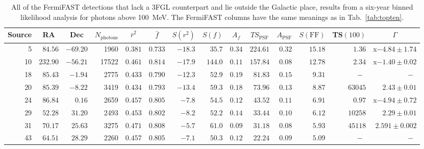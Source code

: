 \documentclass[useAMS,usenatbib]{mn2e}
\begin{document}
\begin{table}
  \caption{ All of the FermiFAST detections that lack a 3FGL
    counterpart and lie outside the Galactic place, results from a
    six-year binned likelihood analysis for photons above 100~MeV.
    The FermiFAST columns have the same meanings as in
    Tab.~\ref{tab:topten}.}
  \label{tab:fermisig100MeV}
\begin{tabular}{rrrrrrrrrrrrrr}
    \hline
    \multicolumn{1}{c}{Source} & \multicolumn{1}{c}{RA} & \multicolumn{1}{c}{Dec}  & \multicolumn{1}{c}{$N_\mathrm{photons}$}  &\multicolumn{1}{c}{$\bar r^2$} & \multicolumn{1}{c}{$\bar f$} & \multicolumn{1}{c}{$S(r^2)$} & \multicolumn{1}{c}{$S(f)$} & \multicolumn{1}{c}{$A_f$} & \multicolumn{1}{c}{$TS_\mathrm{PSF}$} & \multicolumn{1}{c}{$A_\mathrm{PSF}$} & \multicolumn{1}{c}{$S(\mathrm{FF})$} & \multicolumn{1}{c}{TS$(100)$}  & \multicolumn{1}{c}{$\Gamma$} 
 \\
 \hline
 5 & $ 84.56$ & $-69.20$ &   1960 & $0.381$ & $0.733$ & $ -18.3$ & $  35.7$ & $0.34$ & $   224.61$ & $0.32$ & $    15.18$ & $1.36$ & x$-4.84\pm1.74$ \\ 
10 & $232.90$ & $-56.21$ &  17522 & $0.461$ & $0.814$ & $ -17.9$ & $ 144.0$ & $0.11$ & $   157.84$ & $0.08$ & $    12.78$ & $2.34$ & x$-1.40\pm0.02$ \\ 
18 & $ 85.43$ & $ -1.94$ &   2775 & $0.433$ & $0.790$ & $ -12.3$ & $  52.9$ & $0.19$ & $    81.83$ & $0.15$ & $     9.31$ & $~-~$    & $~-~$ \\ 
20 & $ 85.39$ & $ -8.22$ &   3419 & $0.434$ & $0.793$ & $ -13.4$ & $  59.3$ & $0.18$ & $    73.96$ & $0.13$ & $     8.87$ & $63045$ & $2.43\pm0.01$ \\ 
24 & $ 86.84$ & $  0.16$ &   2659 & $0.457$ & $0.805$ & $  -7.8$ & $  54.5$ & $0.12$ & $    43.52$ & $0.11$ & $     6.91$ & $0.97$ & x$-4.94\pm0.72$ \\ 
29 & $ 52.28$ & $ 31.20$ &   2493 & $0.453$ & $0.802$ & $  -8.2$ & $  52.2$ & $0.14$ & $    33.44$ & $0.10$ & $     6.12$ & $10258$ & $2.29\pm0.01$ \\ 
31 & $ 70.17$ & $ 25.63$ &   3275 & $0.471$ & $0.808$ & $  -5.7$ & $  61.0$ & $0.09$ & $    31.18$ & $0.08$ & $     5.93$ & $45118$ & $2.591\pm0.002$ \\
43 & $ 64.51$ & $ 28.29$ &   2260 & $0.457$ & $0.805$ & $  -7.1$ & $  50.3$ & $0.12$ & $    22.24$ & $0.09$ & $     5.09$ & $~-~$    & $~-~$ \\ 
\end{tabular}
\end{table}
\end{document}
